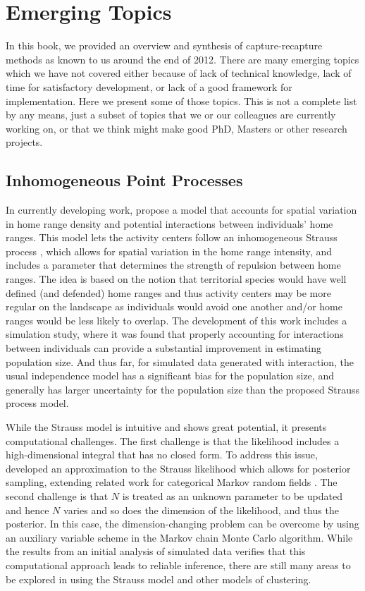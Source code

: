 \section{Emerging Topics}

In this book, we provided an overview and synthesis of
capture-recapture methods as known to us around the end of 2012. There
are many emerging topics which we have not covered either because of
lack of technical knowledge, lack of time for satisfactory
development, or lack of a good framework for implementation. Here we
present some of those topics. This is not a complete list by any means,
just a subset of topics that we or our colleagues are currently working on, or that we think
might make good PhD, Masters or other research projects.



\subsection{Inhomogeneous Point Processes}
\label{last.sec.ipp}

In currently developing work, \citet{reich_etal:2012} propose a model
that accounts for spatial variation in home range density and
potential interactions between individuals' home ranges. This model
lets the activity centers follow an inhomogeneous Strauss process
\citep{strauss:1975}, which allows for spatial variation in the home
range intensity, and includes a parameter that determines the strength
of repulsion between home ranges. The idea is based on the notion
that territorial species would have well defined (and defended) home
ranges and thus activity centers may be more regular on the landscape
as individuals would avoid one another and/or home ranges would be
less likely to overlap. The development of this work includes a
simulation study, where it was found that properly accounting for
interactions between individuals can provide a substantial improvement
in estimating population size. And thus far, for simulated data
generated with interaction, the usual independence model has a
significant bias for the population size, and generally has larger
uncertainty for the population size than the proposed Strauss process
model.

While the Strauss model is intuitive and shows great potential, it
presents computational challenges. The first challenge is that the
likelihood includes a high-dimensional integral that has no closed
form. To address this issue, \citet{reich_etal:2012} developed an
approximation to the Strauss likelihood which allows for posterior
sampling, extending related work for categorical Markov random fields
\citep{green_richardson:2002,smith_smith:2006}. The second challenge
is that $N$ is treated as an unknown parameter to be updated and hence
$N$ varies and so does the dimension of the likelihood, and thus the
posterior. In this case, the dimension-changing problem can be
overcome by using an auxiliary variable scheme in the Markov chain
Monte Carlo algorithm.
While the results from an initial analysis of simulated data verifies
that this computational approach leads to reliable inference, there
are still many areas to be explored in using the Strauss model and
other models of clustering.


